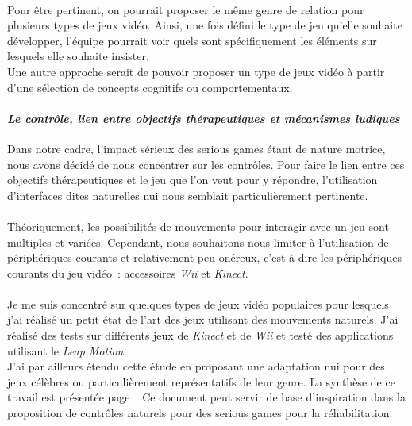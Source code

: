\paragraph{}Pour être pertinent, on pourrait proposer le même genre de relation pour plusieurs types de jeux vidéo. Ainsi, une fois défini le type de jeu qu'elle souhaite développer, l'équipe pourrait voir quels sont spécifiquement les éléments sur lesquels elle souhaite insister. \\
Une autre approche serait de pouvoir proposer un type de jeux vidéo à partir d'une sélection de concepts cognitifs ou comportementaux.

			\paragraph{\emph{Le contrôle, lien entre objectifs thérapeutiques et mécanismes ludiques}\\}
Dans notre cadre, l'impact sérieux des serious games étant de nature motrice, nous avons décidé de nous concentrer sur les contrôles. Pour faire le lien entre ces objectifs thérapeutiques et le jeu que l’on veut pour y répondre, l’utilisation d’interfaces dites naturelles \gls{nui} nous semblait particulièrement pertinente. 

\paragraph{} 
Théoriquement, les possibilités de mouvements pour interagir avec un jeu sont multiples et variées. Cependant, nous souhaitons nous limiter à l'utilisation de périphériques courants et relativement peu onéreux, c'est-à-dire les périphériques courants du jeu vidéo~: accessoires \emph{Wii} et \emph{Kinect}.

\paragraph{} Je me suis concentré sur quelques types de jeux vidéo populaires pour lesquels j'ai réalisé un petit état de l'art des jeux utilisant des mouvements naturels. J'ai réalisé des tests sur différents jeux de \emph{Kinect} et de \emph{Wii} et testé des applications utilisant le \emph{Leap Motion}. \\J'ai par ailleurs étendu cette étude en proposant une adaptation \gls{nui} pour des jeux célèbres ou particulièrement représentatifs de leur genre.
La synthèse de ce travail est présentée page~\pageref{propositions_controles}. Ce document peut servir de base d'inspiration dans la proposition de contrôles naturels pour des serious games pour la réhabilitation.

